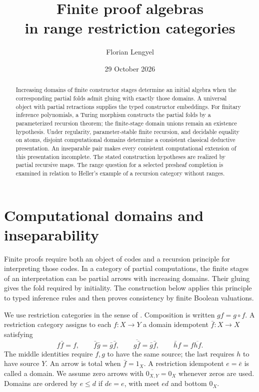\documentclass[11pt]{article}
\title{Finite proof algebras\\in range restriction categories}
\author{Florian Lengyel}
\date{29 October 2026}
\theoremstyle{definition}
\theoremstyle{remark}
\begin{document}
\maketitle
\begin{abstract}
Increasing domains of finite constructor stages determine an initial
algebra when the corresponding partial folds admit gluing with exactly
those domains. A universal object with partial retractions supplies the
typed constructor embeddings. For finitary inference polynomials, a
Turing morphism constructs the partial folds by a parameterized recursion
theorem; the finite-stage domain unions remain an existence hypothesis.
Under regularity, parameter-stable finite
recursion, and decidable equality on atoms, disjoint computational
domains determine a consistent classical deductive presentation. An
inseparable pair makes every consistent computational extension of this
presentation incomplete. The stated construction hypotheses are realized
by partial recursive maps. The range question for a selected presheaf
completion is examined in relation to Heller's example of a recursion
category without ranges.
\end{abstract}
\tableofcontents

\section{Computational domains and inseparability}\label{gen:background}

Finite proofs require both an object of codes and a recursion principle
for interpreting those codes. In a category of partial computations,
the finite stages of an interpretation can be partial arrows with
increasing domains. Their gluing gives the fold required by initiality.
The construction below applies this principle to typed inference rules
and then proves consistency by finite Boolean valuations.

We use restriction categories in the sense of \cite{CockettLack}.
Composition is written $gf=g\circ f$. A restriction category assigns
to each $f:X\to Y$ a domain idempotent $\bar f:X\to X$ satisfying
\[
 f\bar f=f,\qquad \bar f\bar g=\bar g\bar f,
 \qquad\overline{g\bar f}=\bar g\bar f,
 \qquad\bar h f=f\overline{hf}.
\]
The middle identities require $f,g$ to have the same source; the last
requires $h$ to have source $Y$. An arrow is total when $\bar f=1_X$.
A restriction idempotent $e=\bar e$ is called a domain. We assume zero
arrows with $\overline{0_{X,Y}}=0_X$ whenever zeros are used. Domains
are ordered by $e\le d$ if $de=e$, with meet $ed$ and bottom $0_X$.
\end{document}
